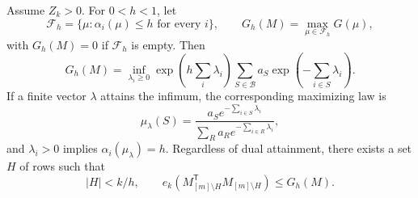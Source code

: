 \begin{theorem}
\label{four:gibbs}
Assume \(Z_k>0\).  For \(0<h<1\), let
\[
 \mathcal F_h=\{\mu:\alpha_i(\mu)\leq h\text{ for every }i\},
 \qquad G_h(M)=\max_{\mu\in\mathcal F_h}G(\mu),
\]
with \(G_h(M)=0\) if \(\mathcal F_h\) is empty.  Then
\begin{equation}\label{four:gibbs-dual}
 G_h(M)=\inf_{\lambda_i\geq0}
  \exp\left(h\sum_i\lambda_i\right)
       \sum_{S\in\mathcal B}a_S
                    \exp\left(-\sum_{i\in S}\lambda_i\right).
\end{equation}
If a finite vector \(\lambda\) attains the infimum, the
corresponding maximizing law is
\begin{equation}\label{four:gibbs-law}
 \mu_\lambda(S)=
 \frac{a_S e^{-\sum_{i\in S}\lambda_i}}
      {\sum_Ra_R e^{-\sum_{i\in R}\lambda_i}},
\end{equation}
and \(\lambda_i>0\) implies \(\alpha_i(\mu_\lambda)=h\).
Regardless of dual attainment, there exists a set \(H\) of rows
such that
\begin{equation}\label{four:gibbs-delete}
 |H|<k/h,\qquad
 e_k(M_{[m]\setminus H}^{\mathsf T}M_{[m]\setminus H})
                         \leq G_h(M).
\end{equation}
\end{theorem}
